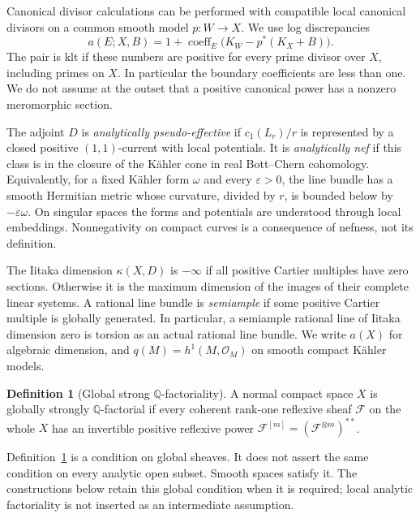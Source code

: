 \documentclass[11pt,letterpaper]{article}
\theoremstyle{definition}
\newtheorem{definition}[theorem]{Definition}
\theoremstyle{remark}
\begin{document}
Canonical divisor calculations can be performed with compatible local
canonical divisors on a common smooth model \(p:W\to X\). We use log
discrepancies
\begin{equation}\label{eq:discrepancy}
 a(E;X,B)=1+\operatorname{coeff}_E
       \bigl(K_W-p^*(K_X+B)\bigr).
\end{equation}
The pair is klt if these numbers are positive for every prime divisor
over \(X\), including primes on \(X\). In particular the boundary
coefficients are less than one. We do not assume at the outset that a
positive canonical power has a nonzero meromorphic section.

The adjoint \(D\) is \emph{analytically pseudo-effective} if
\(c_1(L_r)/r\) is represented by a closed positive \((1,1)\)-current
with local potentials. It is \emph{analytically nef} if this class is
in the closure of the K\"ahler cone in real Bott--Chern cohomology.
Equivalently, for a fixed K\"ahler form \(\omega\) and every
\(\varepsilon>0\), the line bundle has a smooth Hermitian metric
whose curvature, divided by \(r\), is bounded below by
\(-\varepsilon\omega\). On singular spaces the forms and potentials
are understood through local embeddings. Nonnegativity on compact
curves is a consequence of nefness, not its definition.

The Iitaka dimension \(\kappa(X,D)\) is \(-\infty\) if all positive
Cartier multiples have zero sections. Otherwise it is the maximum
dimension of the images of their complete linear systems. A rational
line bundle is \emph{semiample} if some positive Cartier multiple is
globally generated. In particular, a semiample rational line of Iitaka
dimension zero is torsion as an actual rational line bundle.
We write \(a(X)\) for algebraic dimension, and
\(q(M)=h^1(M,\mathcal{O}_M)\) on smooth compact K\"ahler models.

\begin{definition}[Global strong \(\mathbb{Q}\)-factoriality]
\label{def:strong}
A normal compact space \(X\) is globally strongly
\(\mathbb{Q}\)-factorial if every coherent rank-one reflexive sheaf
\(\mathcal{F}\) on the whole \(X\) has an invertible positive reflexive
power \(\mathcal{F}^{[m]}=(\mathcal{F}^{\otimes m})^{**}\).
\end{definition}

Definition~\ref{def:strong} is a condition on global sheaves. It does
not assert the same condition on every analytic open subset. Smooth
spaces satisfy it. The constructions below retain this global
condition when it is required; local analytic factoriality is not
inserted as an intermediate assumption.
\end{document}
